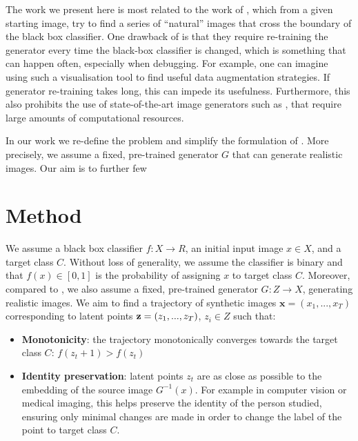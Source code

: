 \documentclass{article}
\begin{document}
The work we present here is most related to the work of \cite{singla2019explanation,joshi2018xgems}, which from a given starting image, try to find a series of ``natural'' images that cross the boundary of the black box classifier. One drawback of \cite{singla2019explanation} is that they require re-training the generator every time the black-box classifier is changed, which is something that can happen often, especially when debugging. For example, one can imagine using such a visualisation tool to find useful data augmentation strategies. If generator re-training takes long, this can impede its usefulness. Furthermore, this also prohibits the use of state-of-the-art image generators such as \cite{karras2019style,brock2018large}, that require large amounts of computational resources. 

In our work we re-define the problem and simplify the formulation of \cite{singla2019explanation}. More precisely, we assume a fixed, pre-trained generator $G$ that can generate realistic images. Our aim is to further few



\section{Method}


We assume a black box classifier $f: X \to R$, an initial input image $x \in X$, and a target class $C$. Without loss of generality, we assume the classifier is binary and that $f(x) \in [0,1]$ is the probability of assigning $x$ to target class $C$. Moreover, compared to \cite{singla2019explanation}, we also assume a fixed, pre-trained generator $G: Z \to X$, generating realistic images. We aim to find a trajectory of synthetic images $\textbf{x} = (x_1, ..., x_T)$ corresponding to latent points $\textbf{z} = (z_1, ..., z_T)$, $z_i \in Z$ such that:
\begin{itemize}
 \item \textbf{Monotonicity}: the trajectory monotonically converges towards the target class $C$: $f(z_t+1) > f(z_{t})$
 \item \textbf{Identity preservation}: latent points $z_t$ are as close as possible to the embedding of the source image $G^{-1}(x)$. For example in computer vision or medical imaging, this helps preserve the identity of the person studied, ensuring only minimal changes are made in order to change the label of the point to target class $C$.
\end{itemize}
\end{document}
